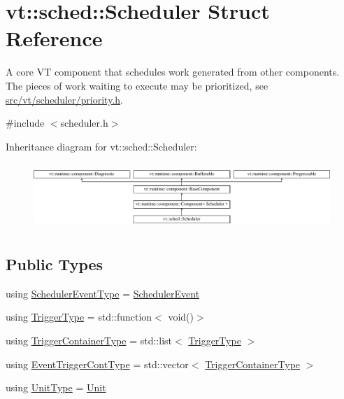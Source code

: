 \hypertarget{structvt_1_1sched_1_1_scheduler}{}\section{vt\+:\+:sched\+:\+:Scheduler Struct Reference}
\label{structvt_1_1sched_1_1_scheduler}


A core VT component that schedules work generated from other components. The pieces of work waiting to execute may be prioritized, see \hyperlink{priority_8h}{src/vt/scheduler/priority.\+h}.  




{\ttfamily \#include $<$scheduler.\+h$>$}

Inheritance diagram for vt\+:\+:sched\+:\+:Scheduler\+:\begin{figure}[H]
\begin{center}
\leavevmode
\includegraphics[height=2.531073cm]{structvt_1_1sched_1_1_scheduler}
\end{center}
\end{figure}
\subsection*{Public Types}
\begin{DoxyCompactItemize}
\item 
using \hyperlink{structvt_1_1sched_1_1_scheduler_ad40b8136b7810da5bab9b27e317e4eb3}{Scheduler\+Event\+Type} = \hyperlink{namespacevt_1_1sched_a54756ec39b60951d6765fcfa692d1616}{Scheduler\+Event}
\item 
using \hyperlink{structvt_1_1sched_1_1_scheduler_aa0c06d6e1c31a5f1c3db474036ad7d29}{Trigger\+Type} = std\+::function$<$ void()$>$
\item 
using \hyperlink{structvt_1_1sched_1_1_scheduler_a0b9fe2a5ee31ca84fa52764a126ad666}{Trigger\+Container\+Type} = std\+::list$<$ \hyperlink{structvt_1_1sched_1_1_scheduler_aa0c06d6e1c31a5f1c3db474036ad7d29}{Trigger\+Type} $>$
\item 
using \hyperlink{structvt_1_1sched_1_1_scheduler_a68203230dc48285d3d50bbb363ed267b}{Event\+Trigger\+Cont\+Type} = std\+::vector$<$ \hyperlink{structvt_1_1sched_1_1_scheduler_a0b9fe2a5ee31ca84fa52764a126ad666}{Trigger\+Container\+Type} $>$
\item 
using \hyperlink{structvt_1_1sched_1_1_scheduler_a398229f29b0940cea85aba4bae78b0be}{Unit\+Type} = \hyperlink{structvt_1_1sched_1_1_unit}{Unit}
\end{DoxyCompactItemize}
